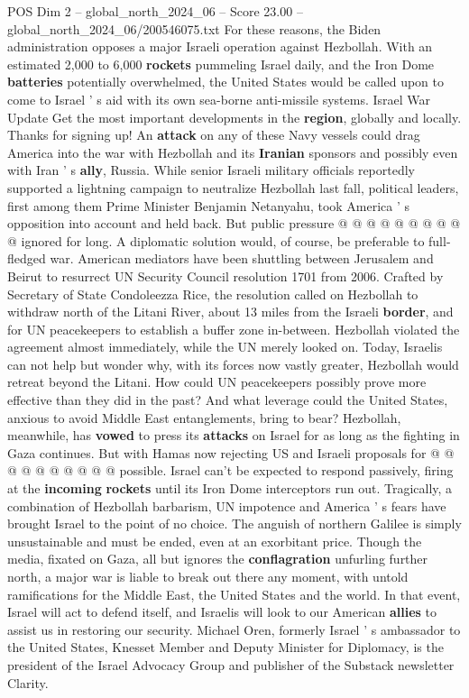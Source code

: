 \begin{textsample}{POS Dim 2 – global\_north\_2024\_06 – Score 23.00 – global\_north\_2024\_06/200546075.txt}
For these reasons, the Biden administration opposes a major Israeli operation against Hezbollah.
With an estimated 2,000 to 6,000 \textbf{rockets} pummeling Israel daily, and the Iron Dome \textbf{batteries} potentially overwhelmed, the United States would be called upon to come to Israel ' s aid with its own sea-borne anti-missile systems.
Israel War Update Get the most important developments in the \textbf{region}, globally and locally.
Thanks for signing up!
An \textbf{attack} on any of these Navy vessels could drag America into the war with Hezbollah and its \textbf{Iranian} sponsors and possibly even with Iran ' s \textbf{ally}, Russia.
While senior Israeli military officials reportedly supported a lightning campaign to neutralize Hezbollah last fall, political leaders, first among them Prime Minister Benjamin Netanyahu, took America ' s opposition into account and held back.
But public pressure @ @ @ @ @ @ @ @ @ @ ignored for long.
A diplomatic solution would, of course, be preferable to full-fledged war.
American mediators have been shuttling between Jerusalem and Beirut to resurrect UN Security Council resolution 1701 from 2006.
Crafted by Secretary of State Condoleezza Rice, the resolution called on Hezbollah to withdraw north of the Litani River, about 13 miles from the Israeli \textbf{border}, and for UN peacekeepers to establish a buffer zone in-between.
Hezbollah violated the agreement almost immediately, while the UN merely looked on.
Today, Israelis can not help but wonder why, with its forces now vastly greater, Hezbollah would retreat beyond the Litani.
How could UN peacekeepers possibly prove more effective than they did in the past?
And what leverage could the United States, anxious to avoid Middle East entanglements, bring to bear?
Hezbollah, meanwhile, has \textbf{vowed} to press its \textbf{attacks} on Israel for as long as the fighting in Gaza continues.
But with Hamas now rejecting US and Israeli proposals for @ @ @ @ @ @ @ @ @ @ possible.
Israel can't be expected to respond passively, firing at the \textbf{incoming} \textbf{rockets} until its Iron Dome interceptors run out.
Tragically, a combination of Hezbollah barbarism, UN impotence and America ' s fears have brought Israel to the point of no choice.
The anguish of northern Galilee is simply unsustainable and must be ended, even at an exorbitant price.
Though the media, fixated on Gaza, all but ignores the \textbf{conflagration} unfurling further north, a major war is liable to break out there any moment, with untold ramifications for the Middle East, the United States and the world.
In that event, Israel will act to defend itself, and Israelis will look to our American \textbf{allies} to assist us in restoring our security.
Michael Oren, formerly Israel ' s ambassador to the United States, Knesset Member and Deputy Minister for Diplomacy, is the president of the Israel Advocacy Group and publisher of the Substack newsletter Clarity.

\end{textsample}
